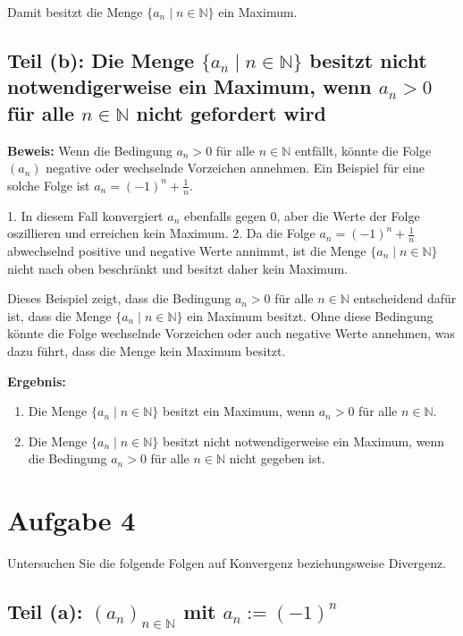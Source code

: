 \documentclass[11pt]{article}
\begin{document}
Damit besitzt die Menge \( \{a_n \mid n \in \mathbb{N}\} \) ein Maximum.

\subsection*{Teil (b): Die Menge \( \{a_n \mid n \in \mathbb{N}\} \) besitzt nicht notwendigerweise ein Maximum, wenn \( a_n > 0 \) für alle \( n \in \mathbb{N} \) nicht gefordert wird}

\textbf{Beweis:}
Wenn die Bedingung \( a_n > 0 \) für alle \( n \in \mathbb{N} \) entfällt, könnte die Folge \( (a_n) \) negative oder wechselnde Vorzeichen annehmen. Ein Beispiel für eine solche Folge ist \( a_n = (-1)^n + \frac{1}{n} \).

1. In diesem Fall konvergiert \( a_n \) ebenfalls gegen 0, aber die Werte der Folge oszillieren und erreichen kein Maximum.
2. Da die Folge \( a_n = (-1)^n + \frac{1}{n} \) abwechselnd positive und negative Werte annimmt, ist die Menge \( \{a_n \mid n \in \mathbb{N}\} \) nicht nach oben beschränkt und besitzt daher kein Maximum.

Dieses Beispiel zeigt, dass die Bedingung \( a_n > 0 \) für alle \( n \in \mathbb{N} \) entscheidend dafür ist, dass die Menge \( \{a_n \mid n \in \mathbb{N}\} \) ein Maximum besitzt. Ohne diese Bedingung könnte die Folge wechselnde Vorzeichen oder auch negative Werte annehmen, was dazu führt, dass die Menge kein Maximum besitzt.

\textbf{Ergebnis:}
\begin{enumerate}
    \item Die Menge \( \{a_n \mid n \in \mathbb{N}\} \) besitzt ein Maximum, wenn \( a_n > 0 \) für alle \( n \in \mathbb{N} \).
    \item Die Menge \( \{a_n \mid n \in \mathbb{N}\} \) besitzt nicht notwendigerweise ein Maximum, wenn die Bedingung \( a_n > 0 \) für alle \( n \in \mathbb{N} \) nicht gegeben ist.
\end{enumerate}

\section*{Aufgabe 4}

Untersuchen Sie die folgende Folgen auf Konvergenz beziehungsweise Divergenz.

\subsection*{Teil (a): \( (a_n)_{n \in \mathbb{N}} \) mit \( a_n := (-1)^n \)}
\end{document}
